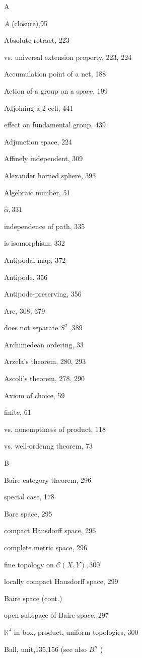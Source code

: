 A

\(\bar{A}\) (closure),95

Absolute retract, 223

vs. universal extension property, 223, 224

Accumulation point of a net, 188

Action of a group on a space, 199

Adjoining a 2-cell, 441

effect on fundamental group, 439

Adjunction space, 224

Affinely independent, 309

Alexander horned sphere, 393

Algebraic number, 51

\(\widehat{\alpha },{331}\)

independence of path, 335

is isomorphism, 332

Antipodal map, 372

Antipode, 356

Antipode-preserving, 356

Arc, 308, 379

does not separate \({S}^{2}\) ,389

Archimedean ordering, 33

Arzela's theorem, 280, 293

Ascoli's theorem, 278, 290

Axiom of choice, 59

finite, 61

vs. nonemptiness of product, 118

vs. well-ordenng theorem, 73

B

Baire category theorem, 296

special case, 178

Bare space, 295

compact Hausdorff space, 296

complete metric space, 296

fine topology on \(\mathcal{C}\left( {X,Y}\right) ,{300}\)

locally compact Hausdorff space, 299

Baire space (cont.)

open subspace of Baire space, 297

\({\mathbb{R}}^{J}\) in box, product, uniform topologies, 300

Ball, unit,135,156 (see also \({B}^{n}\) )

